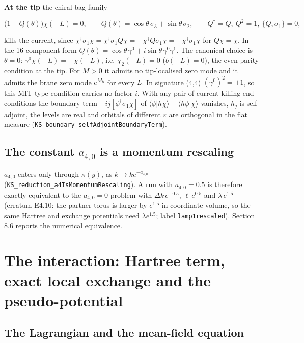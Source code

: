 \documentclass[11pt]{article}
\begin{document}
\textbf{At the tip} the chiral-bag family

\[
\bigl(1-Q(\theta)\bigr)\chi(-L)=0,\qquad Q(\theta)=\cos\theta\,\sigma_3+\sin\theta\,\sigma_2,\qquad Q^\dagger=Q,\ Q^2=1,\ \{Q,\sigma_1\}=0,
\]

kills the current, since $\chi^\dagger\sigma_1\chi=\chi^\dagger\sigma_1Q\chi=-\chi^\dagger Q\sigma_1\chi=-\chi^\dagger\sigma_1\chi$ for $Q\chi=\chi$. In the 16-component form $Q(\theta)=\cos\theta\,\gamma^0+i\sin\theta\,\gamma^0\gamma^1$. The canonical choice is $\theta=0$: $\gamma^0\chi(-L)=+\chi(-L)$, i.e. $\chi_2(-L)=0$ ($b(-L)=0$), the even-parity condition at the tip. For $M>0$ it admits no tip-localised zero mode and it admits the brane zero mode $e^{My}$ for every $L$. In signature (4,4) $(\gamma^0)^2=+1$, so this MIT-type condition carries no factor $i$. With any pair of current-killing end conditions the boundary term $-ij[\phi^\dagger\sigma_1\chi]$ of $\langle\phi|h\chi\rangle-\langle h\phi|\chi\rangle$ vanishes, $h_j$ is self-adjoint, the levels are real and orbitals of different $\varepsilon$ are orthogonal in the flat measure (\texttt{KS\_bound\allowbreak{}ary\_self\allowbreak{}AdjointB\allowbreak{}oundaryT\allowbreak{}erm}).

\subsection{The constant \texorpdfstring{$a_{4,0}$}{a\_4,0} is a momentum rescaling}

$a_{4,0}$ enters only through $\kappa(y)$, as $k\to ke^{-a_{4,0}}$ (\texttt{KS\_reduc\allowbreak{}tion\_a4I\allowbreak{}sMomentu\allowbreak{}mRescali\allowbreak{}ng}). A run with $a_{4,0}=0.5$ is therefore exactly equivalent to the $a_{4,0}=0$ problem with $\Delta k\,e^{-0.5}$, $\ell\,e^{0.5}$ and $\lambda\,e^{1.5}$ (erratum E4.10: the partner torus is larger by $e^{1.5}$ in coordinate volume, so the same Hartree and exchange potentials need $\lambda e^{1.5}$; label \texttt{lamp1res\allowbreak{}caled}). Section 8.6 reports the numerical equivalence.

\section{The interaction: Hartree term, exact local exchange and the pseudo-potential}

\subsection{The Lagrangian and the mean-field equation}
\end{document}
